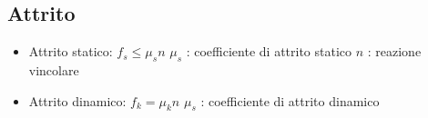 \documentclass[a4paper,12pt,landscape]{article}
\begin{document}
\begin{multicols*}{2}
    \section*{Attrito}
    \begin{itemize}
        \item Attrito statico: $f_s \leq \mu_s n$ \newline
        $\mu_s$ : coefficiente di attrito statico \newline
        $n$ : reazione vincolare
        \item Attrito dinamico: $f_k = \mu_k n$ \newline
        $\mu_s$ : coefficiente di attrito dinamico
    \end{itemize}


\end{multicols*}
\end{document}
